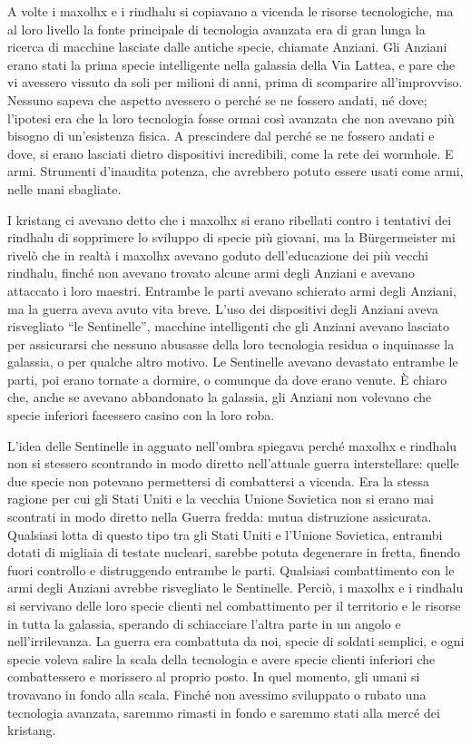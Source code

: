 A volte i maxolhx e i rindhalu si copiavano a vicenda le risorse
tecnologiche, ma al loro livello la fonte principale di tecnologia
avanzata era di gran lunga la ricerca di macchine lasciate dalle antiche
specie, chiamate Anziani. Gli Anziani erano stati la prima specie
intelligente nella galassia della Via Lattea, e pare che vi avessero
vissuto da soli per milioni di anni, prima di scomparire all'improvviso.
Nessuno sapeva che aspetto avessero o perché se ne fossero andati, né
dove; l'ipotesi era che la loro tecnologia fosse ormai così avanzata che
non avevano più bisogno di un'esistenza fisica. A prescindere dal perché
se ne fossero andati e dove, si erano lasciati dietro dispositivi
incredibili, come la rete dei wormhole. E armi. Strumenti d'inaudita
potenza, che avrebbero potuto essere usati come armi, nelle mani
sbagliate.

I kristang ci avevano detto che i maxolhx si erano ribellati contro i
tentativi dei rindhalu di sopprimere lo sviluppo di specie più giovani,
ma la Bürgermeister mi rivelò che in realtà i maxolhx avevano goduto
dell'educazione dei più vecchi rindhalu, finché non avevano trovato
alcune armi degli Anziani e avevano attaccato i loro maestri. Entrambe
le parti avevano schierato armi degli Anziani, ma la guerra aveva avuto
vita breve. L'uso dei dispositivi degli Anziani aveva risvegliato ``le
Sentinelle'', macchine intelligenti che gli Anziani avevano lasciato per
assicurarsi che nessuno abusasse della loro tecnologia residua o
inquinasse la galassia, o per qualche altro motivo. Le Sentinelle
avevano devastato entrambe le parti, poi erano tornate a dormire, o
comunque da dove erano venute. È chiaro che, anche se avevano
abbandonato la galassia, gli Anziani non volevano che specie inferiori
facessero casino con la loro roba.

L'idea delle Sentinelle in agguato nell'ombra spiegava perché maxolhx e
rindhalu non si stessero scontrando in modo diretto nell'attuale guerra
interstellare: quelle due specie non potevano permettersi di combattersi
a vicenda. Era la stessa ragione per cui gli Stati Uniti e la vecchia
Unione Sovietica non si erano mai scontrati in modo diretto nella Guerra
fredda: mutua distruzione assicurata. Qualsiasi lotta di questo tipo tra
gli Stati Uniti e l'Unione Sovietica, entrambi dotati di migliaia di
testate nucleari, sarebbe potuta degenerare in fretta, finendo fuori
controllo e distruggendo entrambe le parti. Qualsiasi combattimento con
le armi degli Anziani avrebbe risvegliato le Sentinelle. Perciò, i
maxolhx e i rindhalu si servivano delle loro specie clienti nel
combattimento per il territorio e le risorse in tutta la galassia,
sperando di schiacciare l'altra parte in un angolo e nell'irrilevanza.
La guerra era combattuta da noi, specie di soldati semplici, e ogni
specie voleva salire la scala della tecnologia e avere specie clienti
inferiori che combattessero e morissero al proprio posto. In quel
momento, gli umani si trovavano in fondo alla scala. Finché non avessimo
sviluppato o rubato una tecnologia avanzata, saremmo rimasti in fondo e
saremmo stati alla mercé dei kristang.

